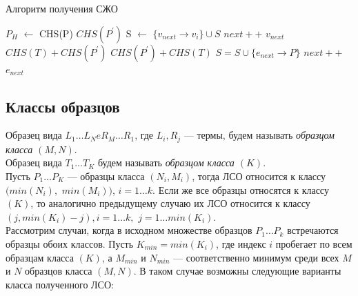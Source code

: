 \documentclass[12pt]{article}
\newcommand*\Let[2]{\State #1 $\gets$ #2}
\begin{document}
\begin{algorithm}[H]
\caption{Алгоритм получения СЖО}\label{alg_sjo}
\begin{algorithmic}[1]
\State {}
\State {}
\State {}
\Let{$P_H$}{CHS(P)}
		\State \Return $CHS(P^{'})$
	\EndIf
		\Let{S}{$\{v_{next} \to v_i\} \cup S$}
		\State $next++$
		\State \Return $v_{next}$
	\EndIf
		\State \Return $CHS(T) + CHS(P^{'})$
	\EndIf
		\State \Return $CHS(P^{'}) + CHS(T)$
	\EndIf
	\State $S = S \cup \{e_{next} \to P\}$
	\State $next++$
	\State \Return $e_{next}$
\EndFunction
\end{algorithmic}
\end{algorithm}

\subsection[Классы образцов]{\large Классы образцов}
\hspace{\parindent} Образец вида $L_1 \ldots L_N e R_M \ldots R_1$, где $L_i, R_j$ --- термы, будем называть \textit{образцом класса $(M, N)$}.\\
\indent Образец вида $T_1 \ldots T_K$ будем называть \textit{образцом класса $(K)$}. \\
\indent Пусть $P_1 \ldots P_K$ --- образцы класса $(N_i, M_i)$, тогда ЛСО относится к классу $(min(N_i),$ $ min(M_i))$, $i = 1 \ldots k$. Если же все образцы относятся к классу $(K)$, то аналогично предыдущему случаю их ЛСО относится к классу $(j, min(K_i) - j), i = 1 \ldots k,$ $j = 1 \ldots min(K_i)$.\\
\indent Рассмотрим случаи, когда в исходном множестве образцов $P_1 \ldots P_k$ встречаются образцы обоих классов. Пусть $K_{min} = min(K_i)$, где индекс $i$ пробегает по всем образцам класса $(K)$, а $M_{min}$ и $N_{min}$ --- соответственно минимум среди всех $M$ и $N$ образцов класса $(M, N)$. В таком случае возможны следующие варианты класса полученного ЛСО:
\end{document}

